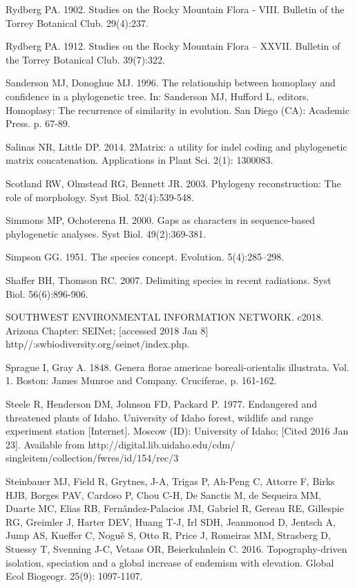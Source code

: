 Rydberg PA. 1902. Studies on the Rocky Mountain Flora - VIII. Bulletin of the Torrey Botanical Club. 29(4):237.

Rydberg PA. 1912. Studies on the Rocky Mountain Flora – XXVII. Bulletin of the Torrey Botanical Club. 39(7):322.

Sanderson MJ, Donoghue MJ. 1996. The relationship between homoplasy and confidence in a phylogenetic tree. In: Sanderson MJ, Hufford L, editors. Homoplasy: The recurrence of similarity in evolution. San Diego (CA): Academic Press. p. 67-89. 

Salinas NR, Little DP. 2014. 2Matrix: a utility for indel coding and phylogenetic matrix concatenation. Applications in Plant Sci. 2(1): 1300083.

Scotland RW, Olmstead RG, Bennett JR. 2003. Phylogeny reconstruction: The role of morphology. Syst Biol. 52(4):539-548.

Simmons MP, Ochoterena H. 2000. Gaps as characters in sequence-based phylogenetic analyses. Syst Biol. 49(2):369-381.

Simpson GG. 1951. The species concept. Evolution. 5(4):285–298.

Shaffer BH, Thomson RC. 2007. Delimiting species in recent radiations. Syst Biol. 56(6):896-906.

SOUTHWEST ENVIRONMENTAL INFORMATION NETWORK. c2018. Arizona Chapter: SEINet; [accessed 2018 Jan 8] http//:swbiodiversity.org/seinet/index.php.

Sprague I, Gray A. 1848. Genera florae americae boreali-orientalis illustrata.  Vol. 1. Boston: James Munroe and Company. Cruciferae, p. 161-162.  

Steele R, Henderson DM, Johnson FD, Packard P. 1977. Endangered and threatened plants of Idaho. University of Idaho forest, wildlife and range experiment station [Internet]. Moscow (ID): University of Idaho; [Cited 2016 Jan 23]. Available from http://digital.lib.uidaho.edu/cdm/ singleitem/collection/fwres/id/154/rec/3

Steinbauer MJ, Field R, Grytnes, J-A, Trigas P, Ah-Peng C, Attorre F, Birks HJB, Borges PAV, Cardoso P, Chou C-H, De Sanctis M, de Sequeira MM,  Duarte MC, Elias RB, Fern\v{a}ndez-Palacios JM, Gabriel R, Gereau RE, Gillespie RG, Greimler J, Harter DEV, Huang T-J, Irl SDH, Jeanmonod D, Jentsch A, Jump AS, Kueffer C, Nogu\v{e} S, Otto R, Price J, Romeiras MM, Strasberg D, Stuessy T, Svenning J-C, Vetaas OR, Beierkuhnlein C. 2016. Topography-driven isolation, speciation and a global increase of endemism with elevation. Global Ecol Biogeogr. 25(9): 1097-1107.

